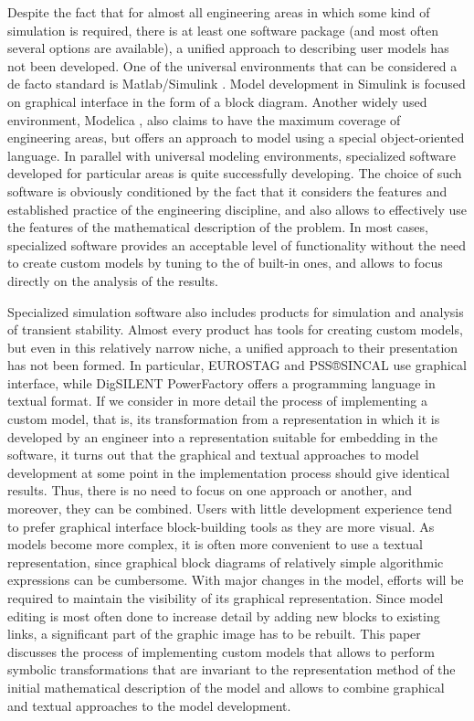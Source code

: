 \documentclass[lettersize,journal]{IEEEtran}
\begin{document}
Despite the fact that for almost all engineering areas in which some kind of simulation is required, there is at least one software package 
(and most often several options are available), a unified approach to describing user models has not been developed. 
One of the universal environments that can be considered a de facto standard is Matlab/Simulink \cite{sumulink}. Model development in Simulink 
is focused on graphical interface in the form of a block diagram. Another widely used environment, Modelica \cite{modelica}, also claims to have 
the maximum coverage of engineering areas, but offers an approach to model using a special object-oriented language. 
In parallel with universal modeling environments, specialized software developed for particular areas is quite successfully developing. 
The choice of such software is obviously conditioned by the fact that it considers the features and established practice of the engineering discipline, 
and also allows to effectively use the features of the mathematical description of the problem. In most cases, specialized software 
provides an acceptable level of functionality without the need to create custom models by tuning to the  of built-in ones, and allows 
to focus directly on the analysis of the results.

Specialized simulation software also includes products for simulation and analysis of transient stability.
Almost every product has tools for creating custom models, but even in this relatively narrow niche, a unified approach to their presentation 
has not been formed. In particular, EUROSTAG \cite{eurostag} and PSS®SINCAL \cite{sincal} use graphical interface, while DigSILENT 
PowerFactory \cite{powefactory} offers a programming language in textual format.
If we consider in more detail the process of implementing a custom model, that is, its transformation from a representation in which 
it is developed by an engineer into a representation suitable for embedding in the software, it turns out that the graphical and textual approaches 
to model development at some point in the implementation process should give identical results. Thus, there is no need to focus on one approach or another,
and moreover, they can be combined. Users with little development experience tend to prefer graphical interface block-building tools as they are more visual. 
As models become more complex, it is often more convenient to use a textual representation, since graphical block diagrams of relatively simple algorithmic 
expressions can be cumbersome. With major changes in the model, efforts will be required to maintain the visibility of its graphical representation. 
Since model editing is most often done to increase detail by adding new blocks to existing links, a significant part of the graphic image has to be rebuilt.
This paper discusses the process of implementing custom models that allows to perform symbolic transformations that are invariant to the representation method
of the initial mathematical description of the model and allows to combine graphical and textual approaches to the model development.
\end{document}
